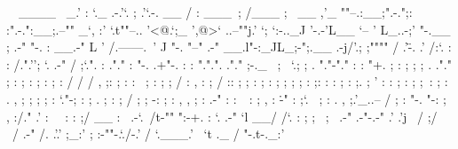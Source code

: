 {   \
     \             ____
      \         _.' :  `._
            .-.'`.  ;   .'`.-.
   __      / : ___\ ;  /___ ; \      __
 ,'_ ""--.:__;".-.";: :".-.":__;.--"" _`,
 :' `.t""--.. '<@.`;_  ',@>` ..--""j.' `;
      `:-.._J '-.-'L__ `-- ' L_..-;'
        "-.__ ;  .-"  "-.  : __.-"
            L ' /.------.\ ' J
             "-.   "--"   .-"
            __.l"-:_JL_;-";.__
         .-j/'.;  ;""""  / .'\"-.
       .' /:`. :  :     /.".'';  `.
    .-"  / ;`.".  :    ."."   :    "-.
 .+"-.  : :   ".".". ."."      ;-._   \
 ; \  `.; ; .   "."-"."        : : "+. ;
 :  ;   ; ;  .   ."."    ;     : ;  : \:
 ;  :   ; :     / /     /  ,   ;:   ;  :
: \  ;  :  ;   ; /     :  ,   : ;  /  ::
;  ; :   ; :  ; ;      ;      ;   :   ;:
:  :  ;  :  ;. ;      '      : :  ;  : ;
;\    :   ; : .          ,   ; ;     ; ;
: `."-;   :  ;      .   ;   :  ;    /  ;
 ;    -:   ; :      ,  ,    ;  : .-"   :
 :\     \  :  ;    ,       : \.-"      :
  ;`.    \  ; :   .   ,    ;.'_..--  / ;
  :  "-.  "-:  ;     ,    :/."      .'  :
   \         \ :    :     ;/  __        :
    \       .-`.\        /t-""  ":-+.   :
     `.  .-"    `l    __/ /`. :  ; ; \  ;
       \   .-" .-"-.-"  .' .'j \  /   ;/
        \ / .-"   /.     .'.' ;_:'    ;
         :-""-.`./-.'     /    `.___.'
               \ `t  ._  /
                "-.t-._:'}%
